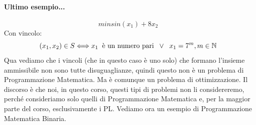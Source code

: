 \paragraph{Ultimo esempio...}
\begin{equation*}
    min sin(x_1) + 8x_2
\end{equation*}
Con vincolo:
\begin{equation*}
(x_1,x_2) \in S \Longleftrightarrow x_1 \hspace{0.2cm} \text{è un numero pari} \hspace{0.2cm} \lor \hspace{0.2cm} x_1 = 7^m,  m \in \mathbb{N}
\end{equation*}
Qua vediamo che i vincoli (che in questo caso è uno solo) che formano l'insieme ammissibile non sono tutte disuguaglianze, quindi questo non è un problema di Programmazione Matematica. Ma è comunque un problema di ottimizzazione. Il discorso è che noi, in questo corso, questi tipi di problemi non li considereremo, perché consideriamo solo quelli di Programmazione Matematica e, per la maggior parte del corso, esclusivamente i PL. Vediamo ora un esempio di Programmazione Matematica Binaria.

